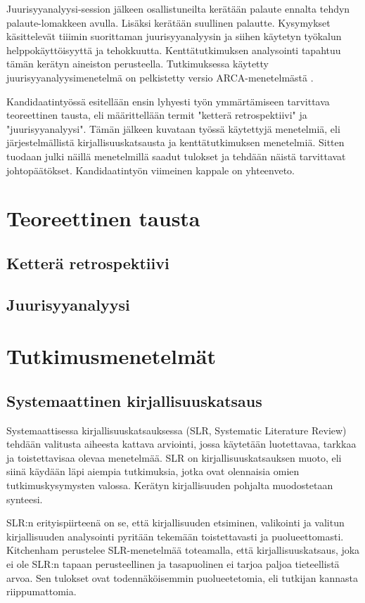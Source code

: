 Juurisyyanalyysi-session jälkeen osallistuneilta kerätään palaute ennalta tehdyn palaute-lomakkeen avulla. Lisäksi kerätään suullinen palautte. Kysymykset käsittelevät tiiimin suorittaman juurisyyanalyysin ja siihen käytetyn työkalun helppokäyttöisyyttä ja tehokkuutta. Kenttätutkimuksen analysointi tapahtuu tämän kerätyn aineiston perusteella. Tutkimuksessa käytetty juurisyyanalyysimenetelmä on pelkistetty versio ARCA-menetelmästä \citep{Lehtinen2011}.

Kandidaatintyössä esitellään ensin lyhyesti työn ymmärtämiseen tarvittava teoreettinen tausta, eli määrittellään termit "ketterä retrospektiivi" ja "juurisyyanalyysi". Tämän jälkeen kuvataan työssä käytettyjä menetelmiä, eli järjestelmällistä kirjallisuuskatsausta ja kenttätutkimuksen menetelmiä. Sitten tuodaan julki näillä menetelmillä saadut tulokset ja tehdään näistä tarvittavat johtopäätökset. Kandidaatintyön viimeinen kappale on yhteenveto.

\section{Teoreettinen tausta}
\subsection{Ketterä retrospektiivi}


\subsection{Juurisyyanalyysi}

\section{Tutkimusmenetelmät}
\subsection{Systemaattinen kirjallisuuskatsaus}
Systemaattisessa kirjallisuuskatsauksessa (SLR, Systematic Literature Review) tehdään valitusta aiheesta kattava arviointi, jossa käytetään luotettavaa, tarkkaa ja toistettavisaa olevaa menetelmää. SLR on kirjallisuuskatsauksen muoto, eli siinä käydään läpi aiempia tutkimuksia, jotka ovat olennaisia omien tutkimuskysymysten valossa. Kerätyn kirjallisuuden pohjalta muodostetaan synteesi. \citep{Kitchenham2007}

SLR:n erityispiirteenä on se, että kirjallisuuden etsiminen, valikointi ja valitun kirjallisuuden analysointi pyritään tekemään toistettavasti ja puolueettomasti. Kitchenham perustelee SLR-menetelmää toteamalla, että kirjallisuuskatsaus, joka ei ole SLR:n tapaan perusteellinen ja tasapuolinen ei tarjoa paljoa tieteellistä arvoa. Sen tulokset ovat todennäköisemmin puolueetetomia, eli tutkijan kannasta riippumattomia. \citep{Kitchenham2007}

